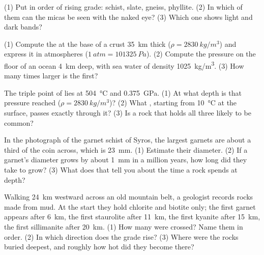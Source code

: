\begin{exercise}[$\star$]\label{exo:g12:metamorphic-rocks:5}
(1) Put in order of rising grade: schist, slate, gneiss, phyllite. (2) In
which of them can the micas be seen with the naked eye? (3) Which one shows
light and dark bands?
\end{exercise}

\begin{exercise}[$\star\star$]\label{exo:g12:metamorphic-rocks:6}
(1) Compute the  at the base of a crust \qty{35}{km}
thick ($\rho = \qty{2830}{kg/m^3}$) and express it in atmospheres
($\qty{1}{atm} = \qty{101325}{Pa}$). (2) Compute the pressure on the floor
of an ocean \qty{4}{km} deep, with sea water of density
\qty{1025}{kg/m^3}. (3) How many times larger is the first?
\end{exercise}

\begin{exercise}[$\star\star$]\label{exo:g12:metamorphic-rocks:7}
The triple point of  lies at \qty{504}{\celsius} and
\qty{0.375}{GPa}. (1) At what depth is that pressure reached ($\rho =
\qty{2830}{kg/m^3}$)? (2) What , starting from
\qty{10}{\celsius} at the surface, passes exactly through it? (3) Is a rock
that holds all three  likely to be common?
\end{exercise}

\begin{exercise}[$\star\star$]\label{exo:g12:metamorphic-rocks:8}
In the photograph of the garnet schist of Syros, the largest garnets are
about a third of the coin across, which is \qty{23}{mm}. (1) Estimate
their diameter. (2) If a garnet's diameter grows by about \qty{1}{mm} in a
million years, how long did they take to grow? (3) What does that tell you
about the time a rock spends at depth?
\end{exercise}

\begin{exercise}[$\star\star$]\label{exo:g12:metamorphic-rocks:9}
Walking \qty{24}{km} westward across an old mountain belt, a geologist
records rocks made from mud. At the start they hold chlorite and biotite
only; the first garnet appears after \qty{6}{km}, the first staurolite after
\qty{11}{km}, the first kyanite after \qty{15}{km}, the first sillimanite
after \qty{20}{km}. (1) How many  were crossed? Name them in order.
(2) In which direction does the grade rise? (3) Where were the rocks buried
deepest, and roughly how hot did they become there?
\end{exercise}

